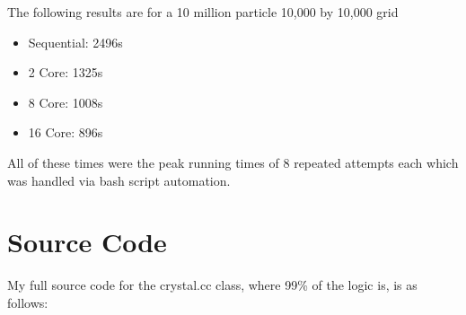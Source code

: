 \documentclass[11pt]{article}
\begin{document}
The following results are for a 10 million particle 10,000 by 10,000 grid

\begin{itemize}
  \item Sequential: 2496s
  \item 2 Core: 1325s
  \item 8 Core: 1008s
  \item 16 Core: 896s
\end{itemize}


All of these times were the peak running times of 8 repeated attempts each which was handled via bash script automation.

\section{Source Code}
My full source code for the crystal.cc class, where 99\% of the logic is, is as follows:

\lstset{frame=tb,
  language=C++
}
\end{document}

